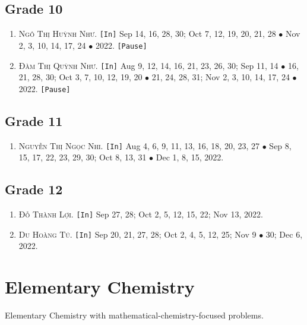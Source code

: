 \documentclass{article}
\numberwithin{equation}{section}
\begin{document}
\subsection{Grade 10}
\begin{enumerate}
	\item \textsc{Ngô Thị Huỳnh Như.} \texttt{[In]} Sep 14, 16, 28, 30; Oct 7, 12, 19, 20, 21, 28 $\bullet$ Nov 2, 3, 10, 14, 17, 24 $\bullet$ 2022. \texttt{[Pause]}
	\item \textsc{Đàm Thị Quỳnh Như.} \texttt{[In]} Aug 9, 12, 14, 16, 21, 23, 26, 30; Sep 11, 14 $\bullet$ 16, 21, 28, 30; Oct 3, 7, 10, 12, 19, 20 $\bullet$ 21, 24, 28, 31; Nov 2, 3, 10, 14, 17, 24 $\bullet$ 2022. \texttt{[Pause]}
\end{enumerate}

\subsection{Grade 11}
\begin{enumerate}
	\item \textsc{Nguyễn Thị Ngọc Nhi.} \texttt{[In]} Aug 4, 6, 9, 11, 13, 16, 18, 20, 23, 27 $\bullet$ Sep 8, 15, 17, 22, 23, 29, 30; Oct 8, 13, 31 $\bullet$ Dec 1, 8,  15, 2022.
\end{enumerate}

\subsection{Grade 12}
\begin{enumerate}
	\item \textsc{Đỗ Thành Lợi.} \texttt{[In]} Sep 27, 28; Oct 2, 5, 12, 15, 22; Nov 13, 2022.
	\item \textsc{Du Hoàng Tú.} \texttt{[In]} Sep 20, 21, 27, 28; Oct 2, 4, 5, 12, 25; Nov 9 $\bullet$ 30; Dec 6, 2022.
\end{enumerate}


\section{Elementary Chemistry}
Elementary Chemistry with mathematical-chemistry-focused problems.
\end{document}
